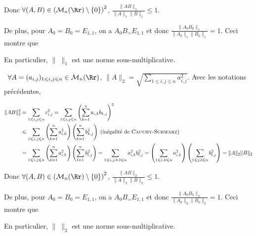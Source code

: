 {\begin{enumerate}
{Donc $\forall(A,B)\in\left(\mathcal{M}_n(\Rr)\setminus\{0\}\right)^2$, $ \frac{\|AB\|_1}{\|A\|_1\|B\|_1}\leqslant 1$.

De plus, pour $A_0=B_0=E_{1,1}$, on a $A_0B_=E_{1,1}$ et donc $ \frac{\|A_0B_0\|_1}{\|A_0\|_1\|B_0\|_1}=1$. Ceci montre que

\begin{center}
\end{center}

En particulier, $\|\;\|_1$ est une norme sous-multiplicative.

\textbullet~$\forall A=(a_{i,j})_{1\leqslant i,j\leqslant n}\in\mathcal{M}_n(\Rr)$, $\|A\|_2=\sqrt{\sum_{1\leqslant i,j\leqslant n}^{}a_{i,j}^2}$. Avec les notations précédentes,

\begin{align*}\ensuremath
\|AB\|_2^2&=\sum_{1\leqslant i,j\leqslant n}^{}c_{i,j}^2=\sum_{1\leqslant i,j\leqslant n}^{}\left(\sum_{k=1}^{n}a_{i,k}b_{k,j}\right)^2\\
 &\leqslant\sum_{1\leqslant i,j\leqslant n}^{}\left(\sum_{k=1}^{n}a_{i,k}^2\right)\left(\sum_{k=1}^{n}b_{k,j}^2\right)\;(\text{inégalité de \textsc{Cauchy}-\textsc{Schwarz}})\\
 &=\sum_{1\leqslant i,j\leqslant n}^{}\left(\sum_{k=1}^{n}a_{i,k}^2\right)\left(\sum_{l=1}^{n}b_{l,j}^2\right)=\sum_{1\leqslant i,j,k,l\leqslant n}^{}a_{i,k}^2b_{l,j}^2=\left(\sum_{1\leqslant i,k\leqslant n}^{}a_{i,k}^2\right)\left(\sum_{1\leqslant j,l\leqslant n}^{}b_{l,j}^2\right)=\|A\|_2\|B\|_2
\end{align*}

Donc $\forall(A,B)\in\left(\mathcal{M}_n(\Rr)\setminus\{0\}\right)^2$, $ \frac{\|AB\|_2}{\|A\|_2\|B\|_2}\leqslant 1$.

De plus, pour $A_0=B_0=E_{1,1}$, on a $A_0B_=E_{1,1}$ et donc $ \frac{\|A_0B_0\|_2}{\|A_0\|_2\|B_0\|_2}=1$. Ceci montre que

\begin{center}
\end{center}

En particulier, $\|\;\|_2$ est une norme sous-multiplicative.
}
\end{enumerate}
}
